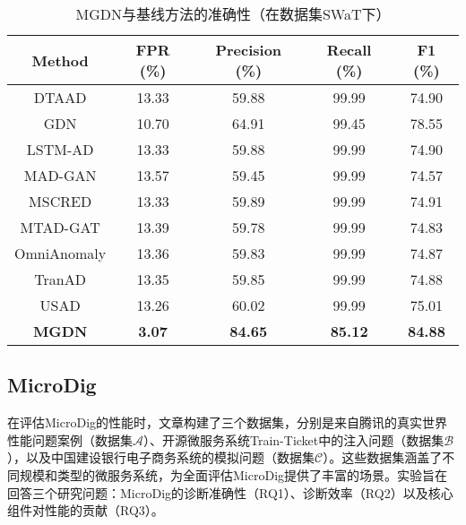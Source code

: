 \begin{table}[ht]
    \centering
    \caption{MGDN与基线方法的准确性（在数据集SWaT下）}
    \label{table:matrics of mgdn and the baseline methods}
    \begin{tabular}{ccccc}
        \toprule
        \textbf{Method} & \textbf{FPR (\%)} & \textbf{Precision (\%)} & \textbf{Recall (\%)} & \textbf{F1 (\%)} \\
        \midrule
        DTAAD       & 13.33 & 59.88 & 99.99 & 74.90 \\
        GDN         & 10.70 & 64.91 & 99.45 & 78.55 \\
        LSTM-AD     & 13.33 & 59.88 & 99.99 & 74.90 \\
        MAD-GAN     & 13.57 & 59.45 & 99.99 & 74.57 \\
        MSCRED      & 13.33 & 59.89 & 99.99 & 74.91 \\
        MTAD-GAT    & 13.39 & 59.78 & 99.99 & 74.83 \\
        OmniAnomaly & 13.36 & 59.83 & 99.99 & 74.87 \\
        TranAD      & 13.35 & 59.85 & 99.99 & 74.88 \\
        USAD        & 13.26 & 60.02 & 99.99 & 75.01 \\
        \textbf{MGDN}   & \textbf{3.07} & \textbf{84.65} & \textbf{85.12} & \textbf{84.88} \\
        \bottomrule
    \end{tabular}
\end{table}

\subsection{MicroDig}

在评估MicroDig的性能时，文章构建了三个数据集，分别是来自腾讯的真实世界性能问题案例（数据集$\mathcal{A}$）、开源微服务系统Train-Ticket中的注入问题（数据集$\mathcal{B}$）\cite{zhou2018fault}，以及中国建设银行电子商务系统的模拟问题（数据集$\mathcal{C}$）。这些数据集涵盖了不同规模和类型的微服务系统，为全面评估MicroDig提供了丰富的场景。实验旨在回答三个研究问题：MicroDig的诊断准确性（RQ1）、诊断效率（RQ2）以及核心组件对性能的贡献（RQ3）。

